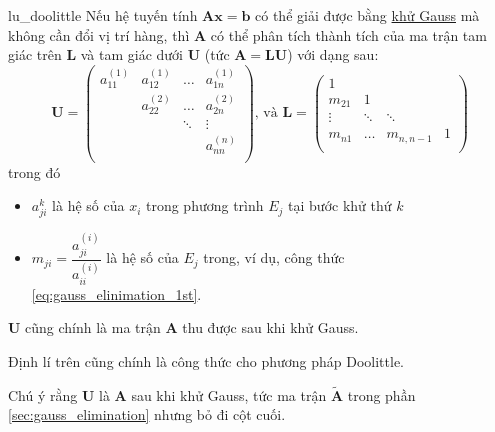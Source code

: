 \documentclass[../../Lectures]{subfiles}
\begin{document}
\begin{ctheorem}{}{lu_doolittle}
    Nếu hệ tuyến tính \(\bm{Ax} = \bm{b}\) có thể giải được bằng
    \hyperref[method:gauss_elimination]{khử Gauss} mà không cần đổi vị trí hàng,
    thì \(\bm{A}\) có thể phân tích thành tích của ma trận tam giác trên
    \(\bm{L}\) và tam giác dưới \(\bm{U}\) (tức \(\bm{A} = \bm{LU}\)) với dạng
    sau:
    \[
        \bm{U} =
            \begin{pmatrix}
                a_{11}^{(1)}  &  a_{12}^{(1)}  &  \dots   &  a_{1n}^{(1)}  \\
                              &  a_{22}^{(2)}  &  \dots   &  a_{2n}^{(2)}  \\
                              &                &  \ddots  &     \vdots     \\
                              &                &          &  a_{nn}^{(n)}  \\
            \end{pmatrix}
        \text{, và }
        \bm{L} =
            \begin{pmatrix}
                    1   &          &                &     \\
                m_{21}  &     1    &                &     \\
                \vdots  &  \ddots  &     \ddots     &     \\
                m_{n1}  &  \dots   &  m_{n, n - 1}  &  1  \\
            \end{pmatrix}
    \]
    trong đó
    \begin{itemize}
        \item \(a_{ji}^{k}\) là hệ số của \(x_i\) trong phương trình \(E_j\) tại
            bước khử thứ \(k\)

        \item \(m_{ji} = \dfrac{a_{ji}^{(i)}}{a_{ii}^{(i)}}\) là hệ số của
            \(E_j\) trong, ví dụ, công thức \eqref{eq:gauss_elinimation_1st}.
    \end{itemize}

    \(\bm{U}\) cũng chính là ma trận \(\bm{A}\) thu được sau khi khử Gauss.
\end{ctheorem}

Định lí trên cũng chính là công thức cho phương pháp Doolittle.

Chú ý rằng \(\bm{U}\) là \(\bm{A}\) sau khi khử Gauss, tức ma trận
\(\bm{\tilde{A}}\) trong phần \ref{sec:gauss_elimination} nhưng bỏ đi cột cuối.
\end{document}
